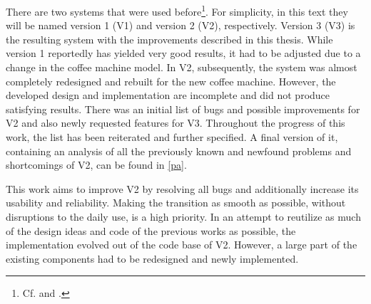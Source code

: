 \documentclass[12pt]{article}
\begin{document}
There are two systems that were used before\footnote{Cf. \cite{Thesis1} and \cite{Thesis2}.}.
For simplicity, in this text they will be named version 1 (V1) and version 2 (V2), respectively.
Version 3 (V3) is the resulting system with the improvements described in this thesis.
While version 1 reportedly has yielded very good results,
it had to be adjusted due to a change in the coffee machine model.
In V2, subsequently, the system was almost completely redesigned and rebuilt for the new coffee machine.
However, the developed design and implementation are incomplete and did not produce satisfying results.
There was an initial list of bugs and possible improvements for V2 and also newly requested features for V3.
Throughout the progress of this work, the list has been reiterated and further specified.
A final version of it, containing an analysis of all the previously known and newfound problems and shortcomings of V2,
can be found in \autoref{pa}.

This work aims to improve V2 by resolving all bugs and additionally increase its usability and reliability.
Making the transition as smooth as possible, without disruptions to the daily use, is a high priority.
In an attempt to reutilize as much of the design ideas and code of the previous works as possible,
the implementation evolved out of the code base of V2.
However, a large part of the existing components had to be redesigned and newly implemented.
\end{document}

